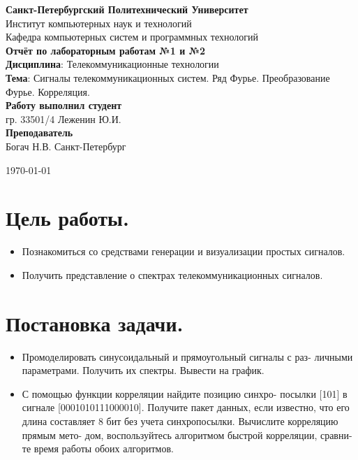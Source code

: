 \documentclass[a4paper,14pt]{extarticle}
\begin{document}
\begin{titlepage}
\centering 
{\bfseries Санкт-Петербургский Политехнический Университет} \\
Институт компьютерных наук и технологий \\
Кафедра компьютерных систем и программных технологий \\
\vspace{5cm}
{\centering \textbf{Отчёт по лабораторным работам №1 и №2} \\ 
\vspace{0.15cm}
\textbf{Дисциплина}: Телекоммуникационные технологии \\
\vspace{0.15cm}
\textbf{Тема}: Сигналы телекоммуникационных систем. Ряд Фурье. Преобразование
Фурье. Корреляция.} \\
\vspace{4cm}
\hfill {\bfseries Работу выполнил студент}  \\
\hfill гр. 33501/4 Леженин Ю.И. \\
\hfill {\bfseries Преподаватель}  \\
\hfill Богач Н.В.
\vfill
Санкт-Петербург \\
{\large \today\par}
\end{titlepage}

\section{Цель работы.}
\begin{itemize}
\item Познакомиться со средствами генерации и визуализации простых сигналов. 
\item Получить представление о спектрах телекоммуникационных сигналов.
\end{itemize}

\section{Постановка задачи.} 

\begin{itemize}

\item Промоделировать синусоидальный и прямоугольный сигналы с раз-
личными параметрами. Получить их спектры. Вывести на график.

\item С помощью функции корреляции найдите позицию синхро-
посылки [101] в сигнале [0001010111000010]. Получите пакет
данных, если известно, что его длина составляет 8 бит без
учета синхропосылки. Вычислите корреляцию прямым мето-
дом, воспользуйтесь алгоритмом быстрой корреляции, сравни-
те время работы обоих алгоритмов.

\end{itemize}
\end{document}
